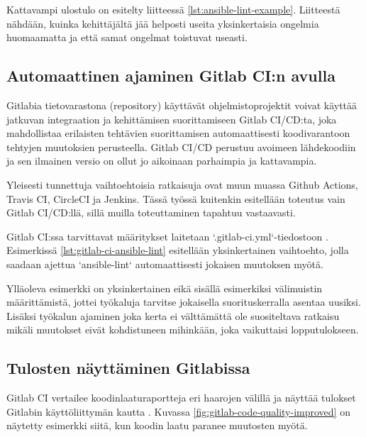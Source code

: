Kattavampi ulostulo on esitelty liitteessä \ref{lst:ansible-lint-example}. Liitteestä
nähdään, kuinka kehittäjältä jää helposti useita yksinkertaisia ongelmia huomaamatta ja
että samat ongelmat toistuvat useasti.

\subsection{Automaattinen ajaminen Gitlab CI:n avulla}

Gitlabia tietovarastona (repository) käyttävät ohjelmistoprojektit voivat käyttää
jatkuvan integraation ja kehittämisen suorittamiseen Gitlab CI/CD:ta, joka mahdollistaa
erilaisten tehtävien suorittamisen automaattisesti koodivarantoon tehtyjen muutoksien
perusteella. Gitlab CI/CD perustuu avoimeen lähdekoodiin ja sen ilmainen versio on ollut
jo aikoinaan parhaimpia ja kattavampia. \parencite{alma9911268330505973}

Yleisesti tunnettuja vaihtoehtoisia ratkaisuja ovat muun muassa Github Actions,
Travis CI, CircleCI ja Jenkins. Tässä työssä kuitenkin esitellään toteutus vain
Gitlab CI/CD:llä, sillä muilla toteuttaminen tapahtuu vastaavasti.

Gitlab CI:ssa tarvittavat määritykset laitetaan `.gitlab-ci.yml`-tiedostoon
\parencite{GitlabCICDDocs}. Esimerkissä \ref{lst:gitlab-ci-ansible-lint} esitellään
yksinkertainen vaihtoehto, jolla saadaan ajettua `ansible-lint` automaattisesti
jokaisen muutoksen myötä.



Ylläoleva esimerkki on yksinkertainen eikä sisällä esimerkiksi välimuistin
määrittämistä, jottei työkaluja tarvitse jokaisella suorituskerralla asentaa
uusiksi. Lisäksi työkalun ajaminen joka kerta ei välttämättä ole suositeltava
ratkaisu mikäli muutokset eivät kohdistuneen mihinkään, joka vaikuttaisi
lopputulokseen.

\subsection{Tulosten näyttäminen Gitlabissa}

Gitlab CI vertailee koodinlaaturaportteja eri haarojen välillä ja näyttää
tulokset Gitlabin käyttöliittymän kautta \parencite{GitlabCICDDocs}. Kuvassa
\ref{fig:gitlab-code-quality-improved} on näytetty esimerkki siitä, kun
koodin laatu paranee muutosten myötä.

